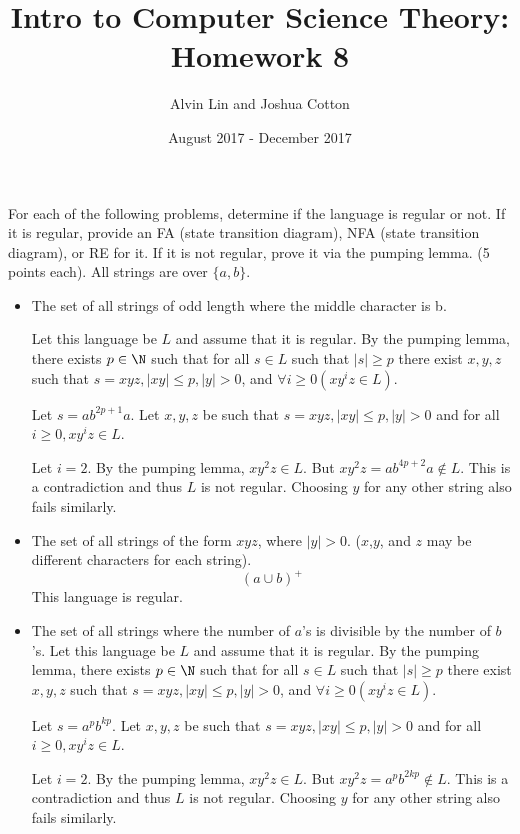 \documentclass{math}
\title{Intro to Computer Science Theory: Homework 8}
\author{Alvin Lin and Joshua Cotton}
\date{August 2017 - December 2017}
\begin{document}
\maketitle

For each of the following problems, determine if the language is regular or
not. If it is regular, provide an FA (state transition diagram), NFA (state
transition diagram), or RE for it. If it is not regular, prove it via the
pumping lemma. (5 points each). All strings are over \( \{a,b\} \).
\begin{itemize}
  \item The set of all strings of odd length where the middle character is b.
  \par
  Let this language be \( L \) and assume that it is regular. By the pumping
  lemma, there exists \( p\in\N \) such that for all \( s\in L \) such that
  \( |s|\ge p \) there exist \( x,y,z \) such that \( s = xyz, |xy|\le p, |y|>0
  \), and \( \forall{i}\ge0(xy^iz\in L) \). \par
  Let \( s = ab^{2p+1}a \). Let \( x,y,z \) be such that
  \( s = xyz, |xy|\le p, |y|>0 \) and for all \( i\ge0, xy^iz\in L \). \par
  Let \( i = 2 \). By the pumping lemma, \( xy^2z\in L \). But \( xy^2z =
  ab^{4p+2}a \notin L\). This is a contradiction and thus \( L \) is not
  regular. Choosing \( y \) for any other string also fails similarly.

  \item The set of all strings of the form \( xyz \), where \( |y|>0 \).
  (\( x \),\( y \), and \( z \) may be different characters for each string).
  \[ (a\cup b)^+ \]
  This language is regular.

  \item The set of all strings where the number of \( a \)'s is divisible by
  the number of \( b \)'s.
  Let this language be \( L \) and assume that it is regular. By the pumping
  lemma, there exists \( p\in\N \) such that for all \( s\in L \) such that
  \( |s|\ge p \) there exist \( x,y,z \) such that \( s = xyz, |xy|\le p, |y|>0
  \), and \( \forall{i}\ge0(xy^iz\in L) \). \par
  Let \( s = a^pb^{kp} \). Let \( x,y,z \) be such that
  \( s = xyz, |xy|\le p, |y|>0 \) and for all \( i\ge0, xy^iz\in L \). \par
  Let \( i = 2 \). By the pumping lemma, \( xy^2z\in L \). But \( xy^2z =
  a^pb^{2kp} \notin L\). This is a contradiction and thus \( L \) is not
  regular. Choosing \( y \) for any other string also fails similarly.


\end{itemize}
\end{document}
